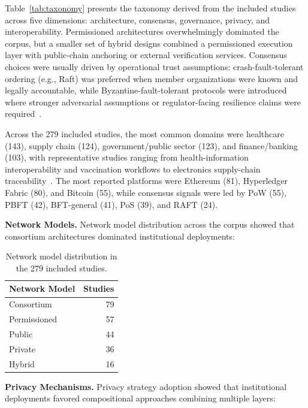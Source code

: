 \documentclass[journal]{IEEEtran}
\begin{document}
Table~\ref{tab:taxonomy} presents the taxonomy derived from the included studies across five dimensions: architecture, consensus, governance, privacy, and interoperability. Permissioned architectures overwhelmingly dominated the corpus, but a smaller set of hybrid designs combined a permissioned execution layer with public-chain anchoring or external verification services. Consensus choices were usually driven by operational trust assumptions: crash-fault-tolerant ordering (e.g., Raft) was preferred when member organizations were known and legally accountable, while Byzantine-fault-tolerant protocols were introduced where stronger adversarial assumptions or regulator-facing resilience claims were required~\cite{sousa2018byzantine,crain2018dbft}.

Across the 279 included studies, the most common domains were healthcare (143), supply chain (124), government/public sector (123), and finance/banking (103), with representative studies ranging from health-information interoperability and vaccination workflows to electronics supply-chain traceability~\cite{manoharan2024healthinterop,costa2022vaccination,tahir2024healthcare,jadon2024electronics}.
The most reported platforms were Ethereum (81), Hyperledger Fabric (80), and Bitcoin (55), while consensus signals were led by PoW (55), PBFT (42), BFT-general (41), PoS (39), and RAFT (24).

\textbf{Network Models.}
Network model distribution across the corpus showed that consortium architectures dominated institutional deployments:

\begin{table}[h]
\centering
\small
\begin{tabular}{lr}
\toprule
\textbf{Network Model} & \textbf{Studies} \\
\midrule
Consortium & 79 \\
Permissioned & 57 \\
Public & 44 \\
Private & 36 \\
Hybrid & 16 \\
\bottomrule
\end{tabular}
\caption{Network model distribution in the 279 included studies.}
\label{tab:network-models}
\end{table}

\textbf{Privacy Mechanisms.}
Privacy strategy adoption showed that institutional deployments favored compositional approaches combining multiple layers:
\end{document}
